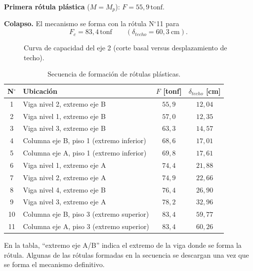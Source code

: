 \documentclass[11pt,letterpaper]{article}
\newcommand{\tonf}{\,\mathrm{tonf}}
\begin{document}
\textbf{Primera rótula plástica} ($M = M_p$): $F = 55{,}9\tonf$.

\textbf{Colapso.} El mecanismo se forma con la rótula N$^\circ$11 para
\[
F_{c} = 83{,}4\tonf \qquad (\delta_{techo} = 60{,}3\ \mathrm{cm}).
\]

\begin{figure}[H]
\centering
{}
\caption{Curva de capacidad del eje 2 (corte basal versus desplazamiento de techo).}
\label{fig:pushover}
\end{figure}

\begin{table}[H]
\centering
\caption{Secuencia de formación de rótulas plásticas.}
\begin{tabular}{clcc}
\toprule
N$^\circ$ & Ubicación & $F$ [tonf] & $\delta_{techo}$ [cm] \\
\midrule
1 & Viga nivel 2, extremo eje B & $55{,}9$ & $12{,}04$ \\
2 & Viga nivel 1, extremo eje B & $57{,}0$ & $12{,}35$ \\
3 & Viga nivel 3, extremo eje B & $63{,}3$ & $14{,}57$ \\
4 & Columna eje B, piso 1 (extremo inferior) & $68{,}6$ & $17{,}01$ \\
5 & Columna eje A, piso 1 (extremo inferior) & $69{,}8$ & $17{,}61$ \\
6 & Viga nivel 1, extremo eje A & $74{,}4$ & $21{,}88$ \\
7 & Viga nivel 2, extremo eje A & $74{,}9$ & $22{,}66$ \\
8 & Viga nivel 4, extremo eje B & $76{,}4$ & $26{,}90$ \\
9 & Viga nivel 3, extremo eje A & $78{,}2$ & $32{,}96$ \\
10 & Columna eje B, piso 3 (extremo superior) & $83{,}4$ & $59{,}77$ \\
11 & Columna eje A, piso 3 (extremo superior) & $83{,}4$ & $60{,}26$ \\
\bottomrule
\end{tabular}
\end{table}
En la tabla, ``extremo eje A/B'' indica el extremo de la viga donde se forma la rótula. Algunas de las rótulas
formadas en la secuencia se descargan una vez que se forma el mecanismo definitivo.
\end{document}
